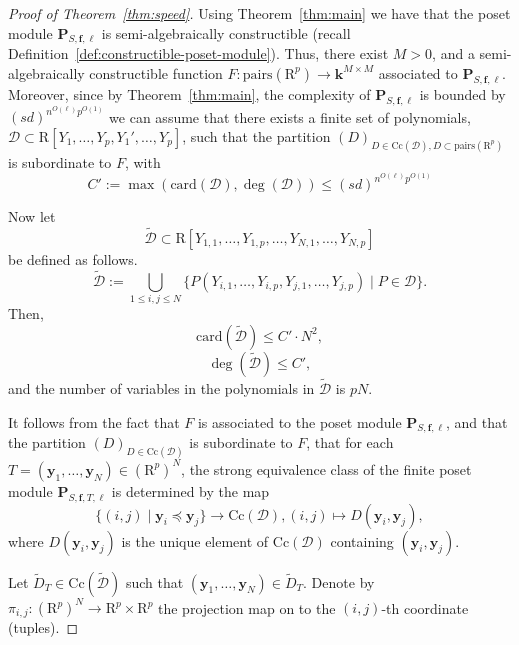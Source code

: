 \documentclass{amsart}[10pts]
\theoremstyle{definition}
\theoremstyle{remark}
\theoremstyle{observation}
\numberwithin{equation}{section}
\newcommand {\R} {\mathrm{R}}
\newcommand{\card}{\mathrm{card}}
\newcommand{\y}{\mathbf{y}}
\newcommand{\Cc}{\mathrm{Cc}}
\newcommand{\Pairs}{\mathrm{pairs}}
\begin{document}
\begin{proof}[Proof of Theorem~\ref{thm:speed}]
    Using Theorem~\ref{thm:main} we have that the poset module
    $\mathbf{P}_{S,\mathbf{f},\ell}$ is semi-algebraically constructible
    (recall Definition~\ref{def:constructible-poset-module}).
    Thus, there exist $M > 0$, and a 
    semi-algebraically constructible function $F:\Pairs(\R^p) \rightarrow \mathbf{k}^{M \times M}$ 
    associated to 
    $\mathbf{P}_{S,\mathbf{f},\ell}$. Moreover, since by Theorem~\ref{thm:main}, the complexity of $\mathbf{P}_{S,\mathbf{f},\ell}$ is bounded by 
    $(s d)^{n^{O(\ell)}p^{O(1)}}$
    we can assume that there exists a finite set
    of polynomials,
    $\mathcal{D} \subset \R[Y_1,\ldots,Y_p,Y_1',\ldots,Y_p]$, 
    such that the partition $(D)_{D \in \Cc(\mathcal{D}), D \subset \Pairs(\R^p)}$ is subordinate to $F$, with
    \begin{equation}
    \label{eqn:C'}
    C'  := \max(\card(\mathcal{D}),\deg(\mathcal{D})) \leq
    (s d)^{n^{O(\ell)}p^{O(1)}}
    \end{equation}
    
    Now let 
    \[
    \widetilde{\mathcal{D}} \subset \R[Y_{1,1},\ldots,Y_{1,p},\ldots, Y_{N,1},\ldots,Y_{N,p}] 
    \]
    be defined as follows.
    \[
    \widetilde{\mathcal{D}} := \bigcup_{1 \leq i,j \leq N} \{P(Y_{i,1},\ldots,Y_{i,p}, Y_{j,1},\ldots,Y_{j,p}) \mid P \in \mathcal{D} \}.
    \]
    Then, 
    \[
    \card(\widetilde{\mathcal{D}}) \leq C' \cdot N^2, 
    \]
    \[
    \deg(\widetilde{\mathcal{D}}) \leq C',
    \]
    and the number of variables in the polynomials in 
    $\widetilde{\mathcal{D}}$ is $p N$.
    
    It follows from the fact that $F$ is associated to the poset module
    $\mathbf{P}_{S,\mathbf{f},\ell}$, and that the partition $(D)_{D \in \Cc(\mathcal{D})}$ is subordinate to $F$,
    that for each $T = (\y_1,\ldots,\y_N) \in (\R^p)^N$, the strong equivalence class of the finite poset module $\mathbf{P}_{S,\mathbf{f},T,\ell}$ is determined by the map
    \[
     \{(i,j) \mid \y_i \preceq \y_j\} 
     \rightarrow \Cc(\mathcal{D}), 
      (i,j) \mapsto D(\y_i,\y_j),
    \]
    where $D(\y_i,\y_j)$ is the unique element of $\Cc(\mathcal{D})$ containing $(\y_i,\y_j)$.
   
    Let $\widetilde{D}_T \in \Cc(\widetilde{\mathcal{D}})$ such that
    $(\y_1,\ldots,\y_N) \in \widetilde{D}_T$.
    Denote by $\pi_{i,j}: (\R^p)^N \rightarrow \R^p \times \R^p$ the projection map on to the $(i,j)$-th coordinate (tuples). 
    

\end{proof}
\end{document}
